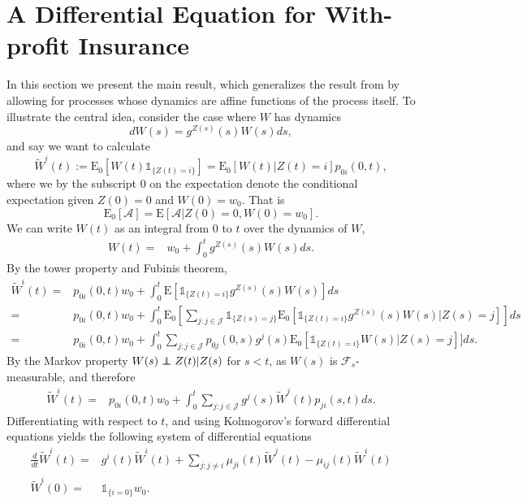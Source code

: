 \documentclass[12pt]{article}
\newcommand{\E}{\text{E}}
\newcommand{\indic}[1]{\mathds{1}_{ \{ #1 \} }}
\newcommand\independent{\protect\mathpalette{\protect\independenT}{\perp}}
\def\independenT#1#2{\mathrel{\rlap{$#1#2$}\mkern2mu{#1#2}}}
\theoremstyle{my_thm}
\begin{document}
\section{A Differential Equation for With-profit Insurance} \label{sec:diff}
In this section we present the main result, which generalizes the result from \citet{Norberg} by allowing for processes whose dynamics are affine functions of the process itself. To illustrate the central idea, consider the case where $W$ has dynamics
$$
dW(s)=g^{Z(s)}(s) W(s) ds,
$$
and say we want to calculate 
$$
\tilde{W}^i(t):=\E_0[W(t)\indic{Z(t)=i}]
=\E_0[W(t)|Z(t)=i]p_{0i}(0,t),
$$ 
where we by the subscript 0 on the expectation denote the conditional expectation given $Z(0)=0$ and $W(0)=w_0$. That is 
$$
\E_0[\mathcal{A}]=\E [\mathcal{A}|Z(0)=0,W(0)=w_0].
$$
We can write $W(t)$ as an integral from 0 to $t$ over the dynamics of $W$,
\begin{align*}
W(t)
=& w_0+\int_0^t  g^{Z(s)}(s) W(s) ds.
\end{align*}
By the tower property and Fubinis theorem,
\begin{align*}
\tilde{W}^i(t)
=&  p_{0i}(0,t) w_0 +
\int_0^t \E[ \indic{Z(t)=i}  g^{Z(s)}(s) W(s)] ds
\\
=&   p_{0i}(0,t) w_0 +
\int_0^t \E_0 \left[ \sum_{j:j \in \mathcal{J}} \indic{Z(s)=j}\E_0[ \indic{Z(t)=i}    g^{Z(s)}(s) W(s)|Z(s)=j] \right] ds\\
=&   p_{0i}(0,t) w_0+
\int_0^t  \sum_{j:j \in \mathcal{J}} p_{0j}(0,s)g^{j}(s)  \E_0[ \indic{Z(t)=i} W(s)|Z(s)=j]] ds.
\end{align*}
By the Markov property $W(s)\independent Z(t)|Z(s)$ for $s<t$, as $W(s)$ is $\mathcal{F}_s$-measurable, and therefore
\begin{align*}
\tilde{W}^i(t)=&  p_{0i}(0,t) w_0 +
\int_0^t  \sum_{j:j \in \mathcal{J}} g^{j}(s)  \tilde{W}^j(t) p_{ji}(s,t)ds.
\end{align*}
Differentiating with respect to $t$, and using Kolmogorov's forward differential equations yields the following system of differential equations
\begin{align*}
\frac{d}{dt} \tilde{W}^i(t)=& g^i(t) \tilde{W}^i(t)+ \sum_{j:j\neq i} \mu_{ji}(t)\tilde{W}^j(t)-\mu_{ij}(t)\tilde{W}^i(t)
\\
\tilde{W}^i(0)=&\indic{i=0}w_0.
\end{align*}
\end{document}
